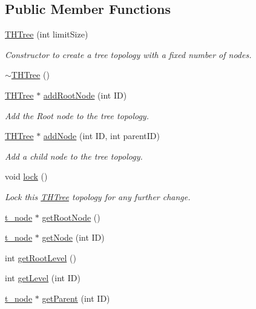 \subsection*{Public Member Functions}
\begin{DoxyCompactItemize}
\item 
\hyperlink{classTHTree_ab4b3df7eb32c1f34f549e7250af4cecf}{T\+H\+Tree} (int limit\+Size)
\begin{DoxyCompactList}\small\item\em Constructor to create a tree topology with a fixed number of nodes. \end{DoxyCompactList}\item 
\hyperlink{classTHTree_ad74e784c88e5893638f8b7664f593035}{$\sim$\+T\+H\+Tree} ()
\item 
\hyperlink{classTHTree}{T\+H\+Tree} $\ast$ \hyperlink{classTHTree_afa2f8a119819db01617199497c9327c3}{add\+Root\+Node} (int ID)
\begin{DoxyCompactList}\small\item\em Add the Root node to the tree topology. \end{DoxyCompactList}\item 
\hyperlink{classTHTree}{T\+H\+Tree} $\ast$ \hyperlink{classTHTree_a4dd1e98529fdd21abe3ebbb685184ffd}{add\+Node} (int ID, int parent\+ID)
\begin{DoxyCompactList}\small\item\em Add a child node to the tree topology. \end{DoxyCompactList}\item 
void \hyperlink{classTHTree_a839ab9db010c87b20c1ba76a79f71b70}{lock} ()
\begin{DoxyCompactList}\small\item\em Lock this \hyperlink{classTHTree}{T\+H\+Tree} topology for any further change. \end{DoxyCompactList}\item 
\hyperlink{structt__node}{t\+\_\+node} $\ast$ \hyperlink{classTHTree_a711df30e7dd52b8f5055a1757bbe0e02}{get\+Root\+Node} ()
\item 
\hyperlink{structt__node}{t\+\_\+node} $\ast$ \hyperlink{classTHTree_a4f17fef67dc2141d2fec2493e3856bf8}{get\+Node} (int ID)
\item 
int \hyperlink{classTHTree_acb72d0655f52443fb9e28a1deaf6c317}{get\+Root\+Level} ()
\item 
int \hyperlink{classTHTree_a790b7da1235d0ff11cbc75b512783ca9}{get\+Level} (int ID)
\item 
\hyperlink{structt__node}{t\+\_\+node} $\ast$ \hyperlink{classTHTree_a55e0aa391cbe6e293ed811b26fd4f380}{get\+Parent} (int ID)

\end{DoxyCompactItemize}
